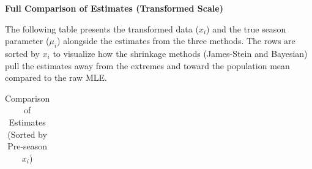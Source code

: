 \documentclass[
  letterpaper,
  DIV=11,
  numbers=noendperiod]{scrreprt}
\renewcommand{\[}{\begin{equation}}
\renewcommand{\]}{\end{equation}}
\theoremstyle{definition}
\theoremstyle{plain}
\theoremstyle{plain}
\theoremstyle{plain}
\theoremstyle{definition}
\theoremstyle{plain}
\theoremstyle{remark}
\begin{document}
\textbf{Full Comparison of Estimates (Transformed Scale)}

The following table presents the transformed data (\(x_i\)) and the true
season parameter (\(\mu_i\)) alongside the estimates from the three
methods. The rows are sorted by \(x_i\) to visualize how the shrinkage
methods (James-Stein and Bayesian) pull the estimates away from the
extremes and toward the population mean compared to the raw MLE.

\begin{longtable}[]{@{}
  >{\centering\arraybackslash}p{}
  >{\centering\arraybackslash}p{}
  >{\centering\arraybackslash}p{}
  >{\centering\arraybackslash}p{}
  >{\centering\arraybackslash}p{}@{}}

\caption{\label{tbl-estimates-sorted}Comparison of Estimates (Sorted by
Pre-season \(x_i\))}

\tabularnewline


\end{longtable}
\end{document}
